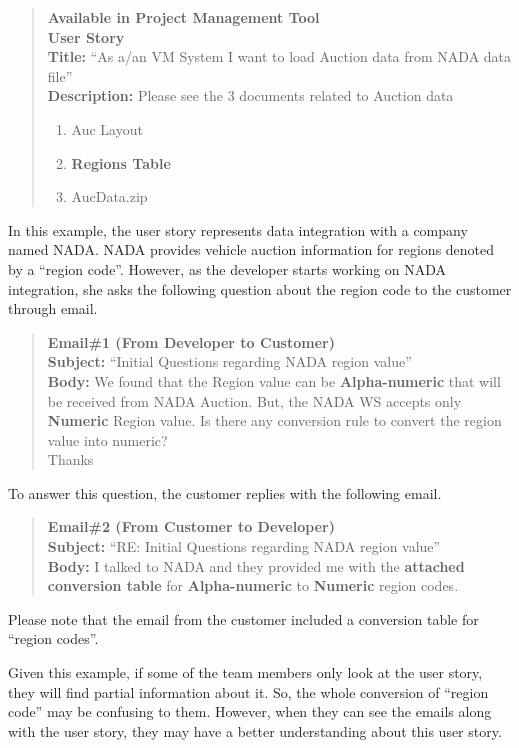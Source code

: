 \begin{quote}
	\textbf{Available in Project Management Tool}\\
	\textbf{User Story}\\
	\textbf{Title:} ``As a/an VM System I want to load Auction data from NADA data file''\\
	\textbf{Description:} Please see the 3 documents related to Auction data
	\begin{enumerate}
		\item Auc Layout
		\item \textbf{Regions Table}
		\item AucData.zip
	\end{enumerate}
\end{quote}

In this example, the user story represents data integration with a company named NADA. NADA provides vehicle auction information for regions denoted by a ``region code''. However, as the developer starts working on NADA integration, she asks the following question about the region code to the customer through email. 

\begin{quote}
\textbf{Email\#1 (From Developer to Customer)}\\
\textbf{Subject:} ``Initial Questions regarding NADA region value''\\
\textbf{Body:} We found that the Region value can be \textbf{Alpha-numeric} that will be received from NADA Auction. But, the NADA WS accepts only \textbf{Numeric} Region value. Is there any conversion rule to convert the region value into numeric? \\
Thanks
\end{quote}

To answer this question, the customer replies with the following email.

\begin{quote}
\textbf{Email\#2 (From Customer to Developer)}\\
\textbf{Subject:} ``RE: Initial Questions regarding NADA region value''\\
\textbf{Body:} I talked to NADA and they provided me with the \textbf{attached conversion table} for \textbf{Alpha-numeric} to \textbf{Numeric} region codes.
\end{quote}

Please note that the email from the customer included a conversion table for ``region codes''. 

Given this example, if some of the team members only look at the user story, they will find partial information about it. So, the whole conversion of ``region code''  may be confusing to them. However, when they can see the emails along with the user story, they may have a better understanding about this user story.


